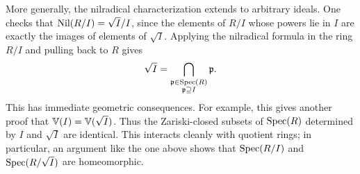 \documentclass[Notebook.tex]{subfiles}
\begin{document}
More generally, the nilradical characterization extends to arbitrary ideals. One checks that $\text{Nil}(R/I)=\sqrt{I}/I$, since the elements of $R/I$ whose powers lie in $I$ are exactly the images of elements of $\sqrt{I}$. Applying the nilradical formula in the ring $R/I$ and pulling back to $R$ gives
\[
\sqrt{I}=\bigcap_{\substack{\mathfrak{p}\in\operatorname{Spec}(R)\\\mathfrak{p}\supseteq I}}\mathfrak{p}.
\]
This has immediate geometric consequences. For example, this gives another proof that $\mathbb V(I) = \mathbb V(\sqrt{I})$. Thus the Zariski-closed subsets of $\operatorname{Spec}(R)$ determined by $I$ and $\sqrt{I}$ are identical. This interacts cleanly with quotient rings; in particular, an argument like the one above shows that $\operatorname{Spec}(R/I)$ and $\operatorname{Spec}(R/\sqrt{I})$ are homeomorphic.

\hrulefill

\newpage 
\end{document}
